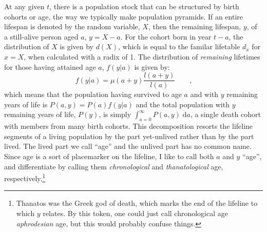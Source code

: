 \documentclass{article}
\newcommand{\dd}{\; \mathrm{d}}
\newcommand{\tc}{\quad\quad\text{,}}
\begin{document}
At any given $t$, there is a population stock that can be structured by birth
cohorts or age, the way we typically make population pyramids. If an entire
lifespan is denoted by the random variable, $X$, then the remaining lifespan,
$y$, of a still-alive person aged $a$, $y = X - a$. For the cohort born in year
$t-a$, the distribution of $X$ is given by $d(X)$, which is equal to the familar
lifetable $d_x$ for $x=X$, when calculated with a radix of 1.
The distribution of \textit{remaining} lifetimes for those having attained age
$a$, $f(y|a)$ is given by:
\begin{equation}
f(y|a) = \mu(a+y) \frac{l(a+y)}{l(a)} \tc
\end{equation}
which means that the population having survived to age $a$ and with $y$
remaining years of life is $P(a,y) = P(a)f(y|a)$ and the total population with
$y$ remaining years of life, $P(y)$, is simply $\int _{a=0}^\infty P(a,y) \dd
a$, a single death cohort with members from many birth cohorts. This
decomposition resorts the lifeline segments of a living population by the part
yet-unlived rather than by the part lived. The lived part we call ``age'' and
the unlived part has no common name. Since age is a sort of placemarker on the lifeline, I like to call both $a$ and $y$ ``age'', and differentiate by
calling them \textit{chronological} and \textit{thanatological}
age, respectively.\footnote{Thanatos was the Greek god of death, which marks the
end of the lifeline to which $y$ relates. By this token, one could just call chronological
age \textit{aphrodesian} age, but this would probably confuse things.}
\end{document}
